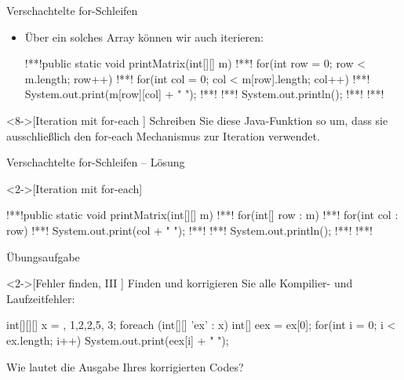 \begin{frame}[fragile]{Verschachtelte for-Schleifen}
    \begin{itemize}[<+(1)->]
        \widei
        \item Über ein solches Array können wir auch iterieren:\pause{}
\begin{plainjava}
!**!public static void printMatrix(int[][] m){
!**!    for(int row = 0; row < m.length; row++) {
!**!        for(int col = 0; col < m[row].length; col++) {
!**!            System.out.print(m[row][col] + " ");
!**!        }
!**!        System.out.println();
!**!    }
!**!}
\end{plainjava}
    \end{itemize}
\ifull
    \begin{exercise}<8->[Iteration mit for-each ]
        Schreiben Sie diese Java-Funktion so um, dass sie ausschließlich den for-each Mechanismus zur Iteration verwendet.
    \end{exercise}
\fi
\end{frame}

\ifull
\begin{frame}[c,fragile]{Verschachtelte for-Schleifen -- Lösung}
    \begin{solve}<2->[Iteration mit for-each]
\begin{plainjava}
!**!public static void printMatrix(int[][] m){
!**!    for(int[] row : m) {
!**!        for(int col : row) {
!**!            System.out.print(col + " ");
!**!        }
!**!        System.out.println();
!**!    }
!**!}
\end{plainjava}
    \end{solve}
\end{frame}
\fi

\ifull
\begin{frame}[c,fragile]{Übungsaufgabe}
    \begin{exercise}<2->[Fehler finden, III ]
        \pause{}Finden und korrigieren Sie alle Kompilier- und Laufzeitfehler:\pause{}
        \begin{plainvoid}
int[][][] x = {{}, {{1,2},{2},{5}}, {{3}}};
foreach (int[][] 'ex' : x) {
    int[] eex = ex[0];
    for(int i = 0; i < ex.length; i++)
        System.out.print(eex[i] + " ");
}
        \end{plainvoid}
        Wie lautet die Ausgabe Ihres korrigierten Codes?
    \end{exercise}
\end{frame}

